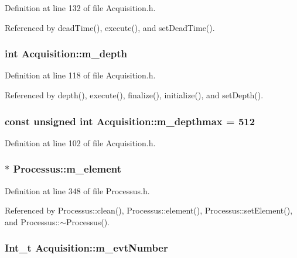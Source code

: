 Definition at line 132 of file Acquisition.h.

Referenced by deadTime(), execute(), and setDeadTime().\hypertarget{classAcquisition_a26628424533a2dd74d24712a14637a72}{
\subsubsection[{m\_\-depth}]{\setlength{\rightskip}{0pt plus 5cm}int {\bf Acquisition::m\_\-depth}}}
\label{classAcquisition_a26628424533a2dd74d24712a14637a72}


Definition at line 118 of file Acquisition.h.

Referenced by depth(), execute(), finalize(), initialize(), and setDepth().\hypertarget{classAcquisition_a7d95ba9a5593451a73754ed44f6bcd1c}{
\subsubsection[{m\_\-depthmax}]{\setlength{\rightskip}{0pt plus 5cm}const unsigned int {\bf Acquisition::m\_\-depthmax} = 512}}
\label{classAcquisition_a7d95ba9a5593451a73754ed44f6bcd1c}


Definition at line 102 of file Acquisition.h.\hypertarget{classProcessus_aa9d24d53c3e52f36786cabb5d8e296e7}{
\subsubsection[{m\_\-element}]{$\ast$ {\bf Processus::m\_\-element}}}
\label{classProcessus_aa9d24d53c3e52f36786cabb5d8e296e7}


Definition at line 348 of file Processus.h.

Referenced by Processus::clean(), Processus::element(), Processus::setElement(), and Processus::$\sim$Processus().\hypertarget{classAcquisition_a32a70daa3f653eae5eafc46dbd0e11a6}{
\subsubsection[{m\_\-evtNumber}]{\setlength{\rightskip}{0pt plus 5cm}Int\_\-t {\bf Acquisition::m\_\-evtNumber}}}
\label{classAcquisition_a32a70daa3f653eae5eafc46dbd0e11a6}


